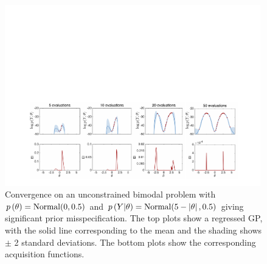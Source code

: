 

\begin{figure}[t]
	\includegraphics[width=0.99\textwidth]{unbounded_opt}
	\caption{Convergence on an unconstrained bimodal problem with $p \left(\theta\right)={\rm Normal}(0, 0.5)$ and $p \left(Y|\theta\right)={\rm Normal}(5-\left|\theta\right|,0.5)$ giving significant prior misspecification. The top plots show a regressed GP, with the solid line corresponding to the mean and the shading shows $\pm$ 2 standard deviations.  The bottom plots show the corresponding acquisition functions. \label{fig:domainAdpat}}
\end{figure}

